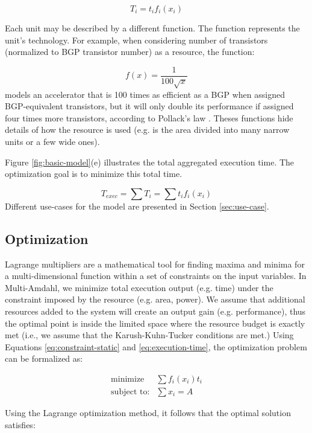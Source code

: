 \documentclass[twocolumn,english]{IEEEtran}
\begin{document}
\[
T_{i}=t_{i}f_{i}(x_{i})\]


Each unit may be described by a different function. The function represents
the unit's technology. For example, when considering number of transistors
(normalized to BGP transistor number) as a resource, the function:

\[
f(x)=\frac{1}{100\sqrt{x}}\]
models an accelerator that is 100 times as efficient as a BGP when
assigned BGP-equivalent transistors, but it will only double its performance
if assigned four times more transistors, according to Pollack\textquoteright{}s
law \cite{Newmicroarchi}. Theses functions hide details of how the
resource is used (e.g. is the area divided into many narrow units
or a few wide ones). 

Figure \ref{fig:basic-model}(e) illustrates the total aggregated
execution time. The optimization goal is to minimize this total time.

\begin{equation}
T_{exec}=\sum T_{i}=\sum t_{i}f_{i}(x_{i})\label{eq:execution-time}\end{equation}
Different use-cases for the model are presented in Section \ref{sec:use-case}.


\subsection{Optimization}

Lagrange multipliers are a mathematical tool for finding maxima and
minima for a multi-dimensional function within a set of constraints
on the input variables. In Multi-Amdahl, we minimize total execution
output (e.g. time) under the constraint imposed by the resource (e.g.
area, power). We assume that additional resources added to the system
will create an output gain (e.g. performance), thus the optimal point
is inside the limited space where the resource budget is exactly met
(i.e., we assume that the Karush-Kuhn-Tucker conditions \cite{NonlinearProgramming}
are met.) Using Equations \eqref{eq:constraint-static} and \eqref{eq:execution-time},
the optimization problem can be formalized as:

\begin{eqnarray*}
\textrm{minimize} & \sum f_{i}(x_{i})t_{i}\\
\textrm{subject to:} & \sum x_{i}=A\end{eqnarray*}


Using the Lagrange optimization method, it follows that the optimal
solution satisfies:
\end{document}
